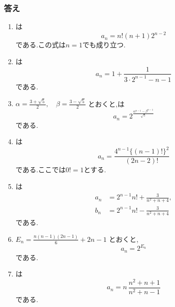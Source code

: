       \subsubsection{答え}\label{節：応用難易度：解答}\label{節：高難易度のもの：解答}
        \begin{enumerate}[label=\textbf{問\arabic*.},leftmargin=3.8em,format=\bookitemlink{practice-advanced}{answer}{problem}]
          \item {}は
                \[
                  a_n=n!(n+1)2^{n-2}
                \]
                である.この式は$n=1$でも成り立つ.
          \item {}は
                \[
                  a_n
                  =1+\frac{1}{3\cdot2^{n-1}-n-1}
                \]
                である.
          \item $\displaystyle
                 \alpha=\frac{3+\sqrt5}{2},\quad
                 \beta=\frac{3-\sqrt5}{2}$
                とおくと,は
                \[
                  a_n=2^{\frac{\alpha^{n-1}-\beta^{n-1}}{\sqrt5}}
                \]
                である.
          \item {}は
                \[
                  a_n
                   =\frac{4^{n-1}\{(n-1)!\}^2}{(2n-2)!}
                \]
                である.ここでは$0!=1$とする.
          \item {}は
                \begin{align*}
                 a_n&=2^{n-1}n!+\frac3{n^2+n+4},\\
                 b_n&=2^{n-1}n!-\frac3{n^2+n+4}
                \end{align*}
                である.
          \item $\displaystyle
                 E_n=\frac{n(n-1)(2n-1)}6+2n-1$
                とおくと,
                \[
                  a_n=2^{E_n}
                \]
                である.
          \item {}は
                \[
                  a_n
                   =n\,\frac{n^2+n+1}{n^2+n-1}
                \]
                である.

\end{enumerate}
